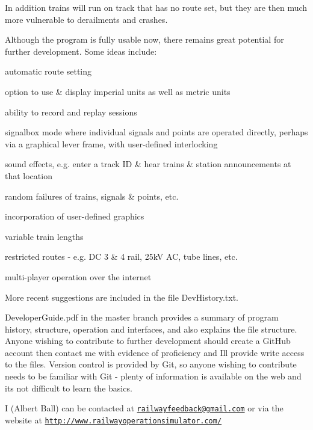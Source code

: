 In addition trains will run on track that has no route set, but they are then much more vulnerable to derailments and crashes.

Although the program is fully usable now, there remains great potential for further development. Some ideas include\+:


\begin{DoxyItemize}
\item automatic route setting
\item option to use \& display imperial units as well as metric units
\item ability to record and replay sessions
\item signalbox mode where individual signals and points are operated directly, perhaps via a graphical lever frame, with user-\/defined interlocking
\item sound effects, e.\+g. enter a track ID \& hear trains \& station announcements at that location
\item random failures of trains, signals \& points, etc.
\item incorporation of user-\/defined graphics
\item variable train lengths
\item restricted routes -\/ e.\+g. DC 3 \& 4 rail, 25kV AC, tube lines, etc.
\item multi-\/player operation over the internet
\end{DoxyItemize}

More recent suggestions are included in the file Dev\+History.\+txt.

\textquotesingle{}Developer\+Guide.\+pdf\textquotesingle{} in the \textquotesingle{}master\textquotesingle{} branch provides a summary of program history, structure, operation and interfaces, and also explains the file structure. Anyone wishing to contribute to further development should create a Git\+Hub account then contact me with evidence of proficiency and I\textquotesingle{}ll provide write access to the files. Version control is provided by \textquotesingle{}Git\textquotesingle{}, so anyone wishing to contribute needs to be familiar with \textquotesingle{}Git\textquotesingle{} -\/ plenty of information is available on the web and it\textquotesingle{}s not difficult to learn the basics.

I (Albert Ball) can be contacted at \href{mailto:railwayfeedback@gmail.com}{\tt railwayfeedback@gmail.\+com} or via the website at \href{http://www.railwayoperationsimulator.com/}{\tt http\+://www.\+railwayoperationsimulator.\+com/} 